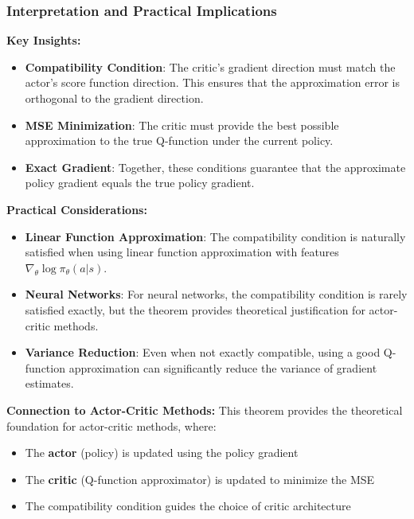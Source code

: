 \subsubsection{Interpretation and Practical Implications}

\textbf{Key Insights:}
\begin{itemize}
    \item \textbf{Compatibility Condition}: The critic's gradient direction must match the actor's score function direction. This ensures that the approximation error is orthogonal to the gradient direction.
    \item \textbf{MSE Minimization}: The critic must provide the best possible approximation to the true Q-function under the current policy.
    \item \textbf{Exact Gradient}: Together, these conditions guarantee that the approximate policy gradient equals the true policy gradient.
\end{itemize}

\textbf{Practical Considerations:}
\begin{itemize}
    \item \textbf{Linear Function Approximation}: The compatibility condition is naturally satisfied when using linear function approximation with features $\nabla_\theta \log \pi_\theta(a|s)$.
    \item \textbf{Neural Networks}: For neural networks, the compatibility condition is rarely satisfied exactly, but the theorem provides theoretical justification for actor-critic methods.
    \item \textbf{Variance Reduction}: Even when not exactly compatible, using a good Q-function approximation can significantly reduce the variance of gradient estimates.
\end{itemize}

\textbf{Connection to Actor-Critic Methods:}
This theorem provides the theoretical foundation for actor-critic methods, where:
\begin{itemize}
    \item The \textbf{actor} (policy) is updated using the policy gradient
    \item The \textbf{critic} (Q-function approximator) is updated to minimize the MSE
    \item The compatibility condition guides the choice of critic architecture
\end{itemize}